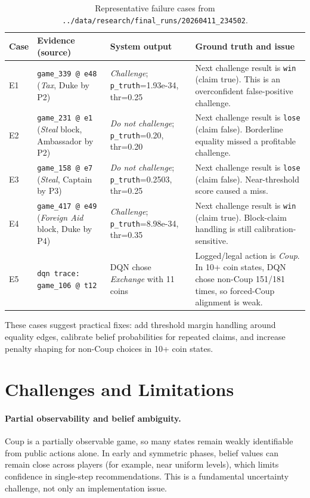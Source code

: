 \documentclass[11pt]{article}
\newcommand{\artifactdirtext}{../data/research/final\_runs/20260411\_234502}
\begin{document}
\begin{table}[H]
\centering
\caption{Representative failure cases from \texttt{\artifactdirtext}.}
\label{tab:error-cases}
\scriptsize
\begin{tabular}{@{}p{} p{} p{} p{}@{}}
\toprule
Case & Evidence (source) & System output & Ground truth and issue \\
\midrule
E1 & \texttt{game\_339 @ e48} (\textit{Tax}, Duke by P2) & \textit{Challenge}; \texttt{p\_truth}=1.93e-34, thr=0.25 & Next challenge result is \texttt{win} (claim true). This is an overconfident false-positive challenge. \\
E2 & \texttt{game\_231 @ e1} (\textit{Steal} block, Ambassador by P2) & \textit{Do not challenge}; \texttt{p\_truth}=0.20, thr=0.20 & Next challenge result is \texttt{lose} (claim false). Borderline equality missed a profitable challenge. \\
E3 & \texttt{game\_158 @ e7} (\textit{Steal}, Captain by P3) & \textit{Do not challenge}; \texttt{p\_truth}=0.2503, thr=0.25 & Next challenge result is \texttt{lose} (claim false). Near-threshold score caused a miss. \\
E4 & \texttt{game\_417 @ e49} (\textit{Foreign Aid} block, Duke by P4) & \textit{Challenge}; \texttt{p\_truth}=8.98e-34, thr=0.35 & Next challenge result is \texttt{win} (claim true). Block-claim handling is still calibration-sensitive. \\
E5 & \texttt{dqn trace: game\_106 @ t12} & DQN chose \textit{Exchange} with 11 coins & Logged/legal action is \textit{Coup}. In 10+ coin states, DQN chose non-Coup 151/181 times, so forced-Coup alignment is weak. \\
\bottomrule
\end{tabular}
\normalsize
\end{table}

These cases suggest practical fixes: add threshold margin handling around equality edges, calibrate belief probabilities for repeated claims, and increase penalty shaping for non-Coup choices in 10+ coin states.

\section{Challenges and Limitations}
\paragraph{Partial observability and belief ambiguity.}
Coup is a partially observable game, so many states remain weakly identifiable from public actions alone. In early and symmetric phases, belief values can remain close across players (for example, near uniform levels), which limits confidence in single-step recommendations. This is a fundamental uncertainty challenge, not only an implementation issue.
\end{document}
